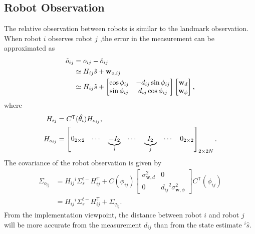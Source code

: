 \documentclass[xcolor=x11names]{article}
\DeclareMathOperator\T{\mathsf{T}}
\begin{document}
\subsection{Robot Observation}
   
   The relative observation between robots is similar to the landmark observation. When robot $i$ observes robot $j$ ,the error in the measurement can be approximated as
   \begin{align}
      \tilde{o}_{ij} &= {o}_{ij}  - \hat{o}_{ij} \notag \\
         &\simeq H_{ij} \tilde{s} + \mathbf{w}_{o,ij} \notag \\
         &\simeq H_{ij} \tilde{s} + 
         \begin{bmatrix} 
            \cos\phi_{ij} & -d_{ij} \sin \phi_{ij}\\
            \sin\phi_{ij} & d_{ij} \cos \phi_{ij}
         \end{bmatrix}
         \begin{bmatrix} 
            \mathbf{w}_{d}\\  \mathbf{w}_{\phi}
         \end{bmatrix},
   \end{align}
   where
   \begin{align*}
      H_{ij} &= C^{\T}(\hat{\theta_i}) H_{o_{ij}}, \\
      H_{o_{ij}} &= \begin{bmatrix} \notag\\
            0_{2\times 2} & \cdots & \underbrace{-I_2}_i & \cdots & \underbrace{I_2}_j & \cdots & 0_{2\times2}
         \end{bmatrix}_{2\times 2N}.
   \end{align*}       
   The covariance of the robot observation is given by
   \begin{align}
      \Sigma_{o_{ij}} &=   H_{ij} {}^i\Sigma^{t-}_{s}  H_{ij}^{\T} +  C(\phi_{ij}) 
         \begin{bmatrix} 
            \sigma^2_{\mathbf{w},d} & 0 \\  0 & {d_{ij}}^2 \sigma^2_{\mathbf{w},\phi}
         \end{bmatrix}
         C^{\T}(\phi_{ij}) \\
         &=   H_{ij} {}^i\Sigma^{t-}_{s}  H_{ij}^{\T} +  \Sigma_{q_{ij}}.
   \end{align}
   From the implementation viewpoint, the distance between robot $i$ and robot $j$ will be more accurate from the measurement $d_{ij}$ than from the state estimate $^i\hat{s}$.
\end{document}
